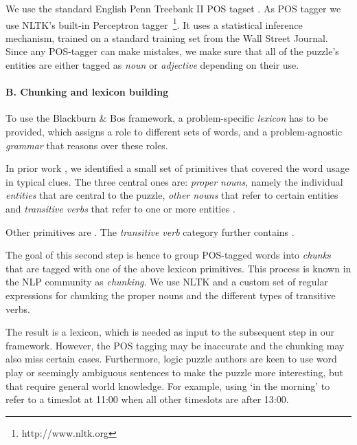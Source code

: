 We use the standard English Penn Treebank II POS tagset \cite{DBLP:journals/coling/MarcusSM94}. As POS tagger we use NLTK's built-in Perceptron tagger~\footnote{http://www.nltk.org}. It uses a statistical inference mechanism, trained on a standard training set from the Wall Street Journal. 
Since any POS-tagger can make mistakes, we make sure that all of the puzzle's entities are either tagged as \textit{noun} or \textit{adjective} depending on their use.

\paragraph{B. Chunking and lexicon building}
To use the Blackburn \& Bos framework, a problem-specific \textit{lexicon} has to be provided, which assigns a role to different sets of words, and a problem-agnostic \textit{grammar} that reasons over these roles.

In prior work \cite{msc/Claes17}, we identified a small set of primitives that covered the word usage in typical clues. The three central ones are: \textit{proper nouns}, namely the individual \textit{entities} that are central to the puzzle, \textit{other nouns}  that refer to certain entities and \textit{transitive verbs} that refer to one or more entities .

Other primitives are . The \textit{transitive verb} category further contains .

The goal of this second step is hence to group POS-tagged words into \textit{chunks} that are tagged with one of the above lexicon primitives. This process is known in the NLP community as \textit{chunking}. We use NLTK and a custom set of regular expressions for chunking the proper nouns and the different types of transitive verbs. 

The result is a lexicon, which is needed as input to the subsequent step in our framework. However, the POS tagging may be inaccurate and the chunking may also miss certain cases. Furthermore, logic puzzle authors are keen to use word play or seemingly ambiguous sentences to make the puzzle more interesting, but that require general world knowledge. For example, using `in the morning' to refer to a timeslot at 11:00 when all other timeslots are after 13:00.

